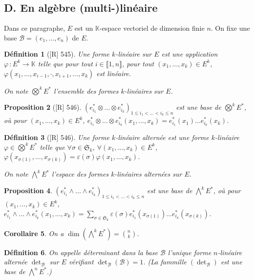 \documentclass[10pt, a4paper, parskip=full, twoside, twocolumn]{report}
\newtheorem{definition}{Définition}
\newtheorem{proposition}[definition]{Proposition}
\newtheorem{corollary}[definition]{Corollaire}
\begin{document}
\subsection*{D. En algèbre (multi-)linéaire}
Dans ce paragraphe, $E$ est un $\mathbb{K}$-espace vectoriel de dimension finie $n$.
On fixe une base $\mathcal{B} = (e_1,\dots,e_n)$ de $E$.
\begin{definition}[\textnormal{[R] 545}]
	Une \emph{forme $k$-linéaire} sur $E$ est une application $\varphi \,\colon E^k\to \mathbb{K}$ telle que pour tout $i\in\llbracket 1,n\rrbracket$, pour tout $(x_1,\dots, x_k)\in E^k$,
	$\varphi(x_1,\dots,x_{i-1}, \cdot, x_{i+1}, \dots, x_k)$ est linéaire.

	On note $\bigotimes^k E^*$ l'ensemble des formes $k$-linéaires sur $E$.
\end{definition}

\begin{proposition}[\textnormal{[R] 546}]
	$\left(e_{i_1}^*\otimes\dots\otimes e_{i_k}^*\right)_{1\leq i_1<\dots < i_k\leq n}$ est une base de $\bigotimes^kE^*$,
	où pour $(x_1,\dots, x_k)\in E^k$, $e_{i_1}^*\otimes\dots\otimes e_{i_k}^*(x_1,\dots, x_k) = e_{i_1}^*(x_1)\dots e_{i_k}^*(x_k)$.
\end{proposition}

\begin{definition}[\textnormal{[R] 546}]
	Une forme $k$-linéaire \emph{alternée} est une forme $k$-linéaire $\varphi\in\bigotimes^kE^*$
	telle que $\forall\sigma\in\mathfrak{S}_k$, $\forall(x_1,\dots, x_k)\in E^k$, $\varphi(x_{\sigma(1)},\dots, x_{\sigma(k)}) = \varepsilon(\sigma)\varphi(x_1,\dots, x_k)$.

	On note $\bigwedge^k E^*$ l'espace des formes $k$-linéaires alternées sur $E$.
\end{definition}

\begin{proposition}
	$\left(e_{i_1}^*\wedge \dots \wedge e_{i_k}^*\right)_{1\leq i_1 < \dots < i_k\leq n}$ est une base de $\bigwedge^kE^*$, où pour $(x_1,\dots,x_k)\in E^k$,
	$e_{i_1}^*\wedge \dots \wedge e_{i_k}^*(x_1,\dots,x_k) = \sum_{\sigma\in\mathfrak{S}_k} \varepsilon(\sigma) e_{i_1}^*(x_{\sigma(1)}) \dots e_{i_k}^*(x_{\sigma(k)})$.
\end{proposition}

\begin{corollary}
	On a $\dim\left(\bigwedge^kE^*\right) = {n \choose k}$.
\end{corollary}

\begin{definition}
	On appelle \emph{déterminant dans la base $\mathcal{B}$} l'unique forme $n$-linéaire alternée $\det_{\mathcal{B}}$ sur $E$ vérifiant
	$\det_{\mathcal{B}}(\mathcal{B}) = 1$. (La fammille $\left(\det_{\mathcal{B}}\right)$ est une base de $\bigwedge^n E^*$.)
\end{definition}
\end{document}
